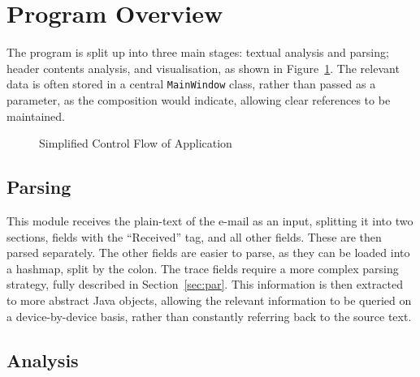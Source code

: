 \section{Program Overview}

The program is split up into three main stages: textual analysis and parsing; header contents analysis, and visualisation, as shown in Figure~\ref{fig:con}.  The relevant data is often stored in a central \texttt{MainWindow} class, rather than passed as a parameter, as the composition would indicate, allowing clear references to be maintained.

\begin{figure}[!ht]
	\centering
{}
\caption{Simplified Control Flow of Application}
\label{fig:con}
\end{figure}

\subsection{Parsing}

This module receives the plain-text of the e-mail as an input, splitting it into two sections, fields with the ``Received'' tag, and all other fields.  These are then parsed separately.  The other fields are easier to parse, as they can be loaded into a hashmap, split by the colon.  The trace fields require a more complex parsing strategy, fully described in Section~\ref{sec:par}.  This information is then extracted to more abstract Java objects, allowing the relevant information to be queried on a device-by-device basis, rather than constantly referring back to the source text.

\subsection{Analysis}

